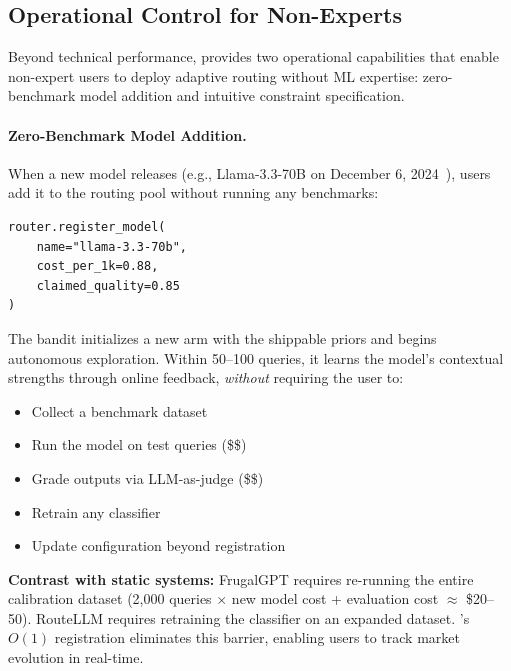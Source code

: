 
\subsection{Operational Control for Non-Experts}
\label{sec:operational_control}

Beyond technical performance, \ours{} provides two operational capabilities that enable non-expert users to deploy adaptive routing without ML expertise: zero-benchmark model addition and intuitive constraint specification.

\paragraph{Zero-Benchmark Model Addition.}
When a new model releases (e.g., Llama-3.3-70B on December 6, 2024~\cite{meta2024llama33}), users add it to the routing pool without running any benchmarks:

\begin{small}
\begin{verbatim}
router.register_model(
    name="llama-3.3-70b",
    cost_per_1k=0.88,
    claimed_quality=0.85
)
\end{verbatim}
\end{small}

The bandit initializes a new arm with the shippable priors and begins autonomous exploration. Within 50--100 queries, it learns the model's contextual strengths through online feedback, \textit{without} requiring the user to:

\begin{itemize}[leftmargin=*,nosep]
    \item Collect a benchmark dataset
    \item Run the model on test queries (\$\$)
    \item Grade outputs via LLM-as-judge (\$\$)
    \item Retrain any classifier
    \item Update configuration beyond registration
\end{itemize}

\noindent\textbf{Contrast with static systems:} FrugalGPT requires re-running the entire calibration dataset (2,000 queries $\times$ new model cost + evaluation cost $\approx$ \$20--50). RouteLLM requires retraining the classifier on an expanded dataset. \ours{}'s $O(1)$ registration eliminates this barrier, enabling users to track market evolution in real-time.

